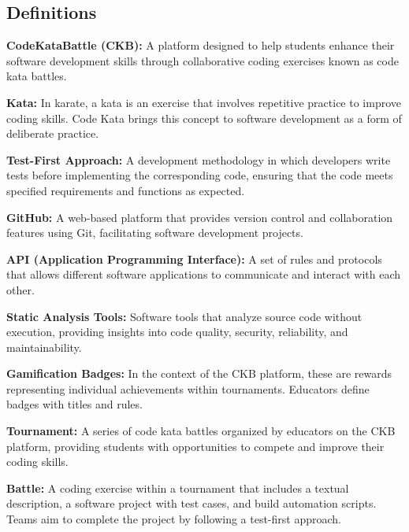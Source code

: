 \subsection{Definitions}
\begin{description}[labelwidth=4em, leftmargin=5em, style=nextline]

    \item \textbf{CodeKataBattle (CKB):} A platform designed to help students enhance their software development skills through collaborative coding exercises known as code kata battles.

    \item \textbf{Kata:} In karate, a kata is an exercise that involves repetitive practice to improve coding skills. Code Kata brings this concept to software development as a form of deliberate practice.

    \item \textbf{Test-First Approach:} A development methodology in which developers write tests before implementing the corresponding code, ensuring that the code meets specified requirements and functions as expected.

    \item \textbf{GitHub:} A web-based platform that provides version control and collaboration features using Git, facilitating software development projects. \cite{GitHub}

    \item \textbf{API (Application Programming Interface):} A set of rules and protocols that allows different software applications to communicate and interact with each other.

    \item \textbf{Static Analysis Tools:} Software tools that analyze source code without execution, providing insights into code quality, security, reliability, and maintainability.

    \item \textbf{Gamification Badges:} In the context of the CKB platform, these are rewards representing individual achievements within tournaments. Educators define badges with titles and rules.

    \item \textbf{Tournament:} A series of code kata battles organized by educators on the CKB platform, providing students with opportunities to compete and improve their coding skills.

    \item \textbf{Battle:} A coding exercise within a tournament that includes a textual description, a software project with test cases, and build automation scripts. Teams aim to complete the project by following a test-first approach.


\end{description}
